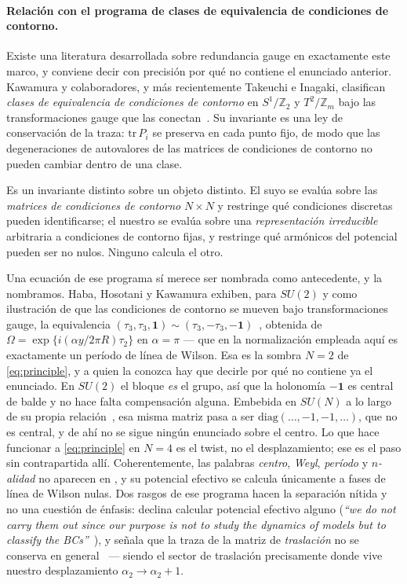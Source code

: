 \documentclass[11pt,a4paper]{article}
\newcommand{\ZZ}{\mathbb{Z}}
\begin{document}
\paragraph{Relación con el programa de clases de equivalencia de condiciones de contorno.}
Existe una literatura desarrollada sobre redundancia gauge en exactamente este marco, y
conviene decir con precisión por qué no contiene el enunciado anterior. Kawamura y
colaboradores, y más recientemente Takeuchi e Inagaki, clasifican \emph{clases de
equivalencia de condiciones de contorno} en $S^1/\ZZ_2$ y $T^2/\ZZ_m$ bajo las
transformaciones gauge que las conectan~\cite{HHK,KawamuraMiura,Takeuchi1,Takeuchi2}. Su
invariante es una ley de conservación de la traza: $\mathrm{tr}\,P_i$ se preserva en cada
punto fijo, de modo que las degeneraciones de autovalores de las matrices de condiciones de
contorno no pueden cambiar dentro de una clase.

Es un invariante distinto sobre un objeto distinto. El suyo se evalúa sobre las
\emph{matrices de condiciones de contorno} $N\times N$ y restringe qué condiciones discretas
pueden identificarse; el nuestro se evalúa sobre una \emph{representación irreducible}
arbitraria a condiciones de contorno fijas, y restringe qué armónicos del potencial pueden ser
no nulos. Ninguno calcula el otro.

Una ecuación de ese programa sí merece ser nombrada como antecedente, y la nombramos. Haba,
Hosotani y Kawamura exhiben, para $SU(2)$ y como ilustración de que las condiciones de contorno
se mueven bajo transformaciones gauge, la equivalencia
$(\tau_3,\tau_3,\mathbf{1})\sim(\tau_3,-\tau_3,-\mathbf{1})$~\cite[Ec.~(2.20)]{HHK}, obtenida
de $\Omega=\exp\{i(\alpha y/2\pi R)\tau_2\}$ en $\alpha=\pi$ --- que en la normalización
empleada aquí es exactamente un período de línea de Wilson. Esa es la sombra $N=2$ de
\eqref{eq:principle}, y a quien la conozca hay que decirle por qué no contiene ya el enunciado.
En $SU(2)$ el bloque \emph{es} el grupo, así que la holonomía $-\mathbf{1}$ es central de balde
y no hace falta compensación alguna. Embebida en $SU(N)$ a lo largo de su propia
relación~\cite[Ec.~(2.21)]{HHK}, esa misma matriz pasa a ser $\mathrm{diag}(\dots,-1,-1,\dots)$,
que no es central, y de ahí no se sigue ningún enunciado sobre el centro. Lo que hace funcionar
a \eqref{eq:principle} en $N=4$ es el twist, no el desplazamiento; ese es el paso sin
contrapartida allí. Coherentemente, las palabras \emph{centro}, \emph{Weyl}, \emph{período} y
\emph{$n$-alidad} no aparecen en \cite{HHK}, y su potencial efectivo se calcula únicamente a
fases de línea de Wilson nulas. Dos rasgos de ese programa hacen la separación nítida y no
una cuestión de énfasis: declina calcular potencial efectivo alguno (\emph{``we do not carry
them out since our purpose is not to study the dynamics of models but to classify the
BCs''}~\cite[p.~7]{KawamuraMiura}), y señala que la traza de la matriz de \emph{traslación}
no se conserva en general~\cite[n.~3]{Takeuchi1} --- siendo el sector de traslación
precisamente donde vive nuestro desplazamiento $\alpha_2\to\alpha_2+1$.
\end{document}
